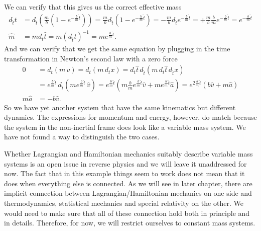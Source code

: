 We can verify that this gives us the correct effective mass
\begin{equation}
	\begin{aligned}
	d_{\hat{t}} t  &=d_{\hat{t}} \left( \frac{m}{b} (1-e^{-\frac{b}{m}\hat{t}}) \right) =\frac{m}{b} d_{\hat{t}} (1-e^{-\frac{b}{m}\hat{t}}) = - \frac{m}{b} d_{\hat{t}} e^{-\frac{b}{m}\hat{t}} = + \frac{m}{b} \frac{b}{m} e^{-\frac{b}{m}\hat{t}} = e^{-\frac{b}{m}\hat{t}} \\
	\hat{m} &= m d_t \hat{t} = m (d_{\hat{t}} t)^{-1} = m e^{\frac{b}{m}\hat{t}}.
	\end{aligned}
\end{equation}
And we can verify that we get the same equation by plugging in the time transformation in Newton's second law with a zero force
\begin{equation}
	\begin{aligned}
		0 &= d_t  (m \, v) = d_t  (m \, d_t x) = d_t \hat{t} \, d_{\hat{t}}  (m \, d_t \hat{t} \, d_{\hat{t}} x) \\ &= e^{\frac{b}{m}\hat{t}} \, d_{\hat{t}}  (m e^{\frac{b}{m}\hat{t}} \, \hat{v}) = e^{\frac{b}{m}\hat{t}} \left( m \frac{b}{m} e^{\frac{b}{m}\hat{t}} \hat{v} + m e^{\frac{b}{m}\hat{t}} \hat{a} \right)  = e^{2\frac{b}{m}\hat{t}} \left( b \hat{v} + m \hat{a} \right) \\
		m \hat{a} &= - b \hat{v}.
	\end{aligned}
\end{equation}
So we have yet another system that have the same kinematics but different dynamics. The expressions for momentum and energy, however, do match because the system in the non-inertial frame does look like a variable mass system. We have not found a way to distinguish the two cases.

Whether Lagrangian and Hamiltonian mechanics suitably describe variable mass systems is an open issue in reverse physics and we will leave it unaddressed for now. The fact that in this example things seem to work does not mean that it does when everything else is connected. As we will see in later chapter, there are implicit connection between Lagrangian/Hamiltonian mechanics on one side and thermodynamics, statistical mechanics and special relativity on the other. We would need to make sure that all of these connection hold both in principle and in details. Therefore, for now, we will restrict ourselves to constant mass systems.

